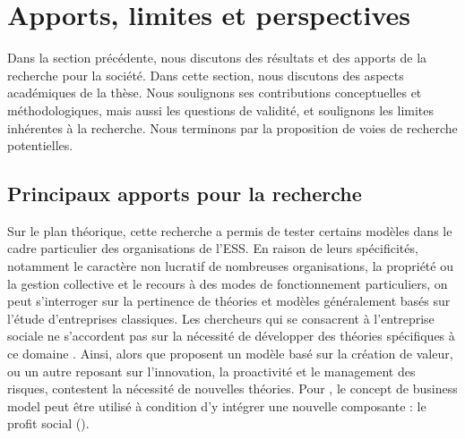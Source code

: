 \section{Apports, limites et perspectives}

    Dans la section précédente, nous discutons des résultats et des apports de la recherche pour la société. Dans cette section, nous discutons des aspects académiques de la thèse. Nous soulignons ses contributions conceptuelles et méthodologiques, mais aussi les questions de validité, et soulignons les limites inhérentes à la recherche. Nous terminons par la proposition de voies de recherche potentielles.

    \subsection{Principaux apports pour la recherche}

    Sur le plan théorique, cette recherche a permis de tester certains modèles dans le cadre particulier des organisations de l'ESS. En raison de leurs spécificités, notamment le caractère non lucratif de nombreuses organisations, la propriété ou la gestion collective et le recours à des modes de fonctionnement particuliers, on peut s'interroger sur la pertinence de théories et modèles généralement basés sur l'étude d'entreprises classiques. Les chercheurs qui se consacrent à l'entreprise sociale ne s'accordent pas sur la nécessité de développer des théories spécifiques à ce domaine \parencite{valentinov2008economics, dacin2010social, weerawardena2006investigating, santos2012positive}. Ainsi, alors que \textcite{santos2005organizational} proposent un modèle basé sur la création de valeur, ou \textcite{weerawardena2006investigating} un autre reposant sur l'innovation, la proactivité et le management des risques, \textcite{dacin2010social} contestent la nécessité de nouvelles théories. Pour \textcite{yunus2010building-1}, le concept de business model peut être utilisé à condition d'y intégrer une nouvelle composante : le profit social (). \\

